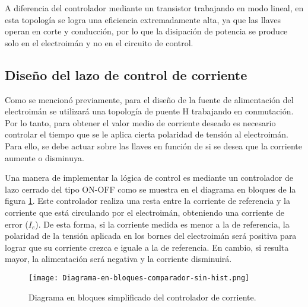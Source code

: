 A diferencia del controlador mediante un transistor trabajando en modo lineal, en esta topología se logra una eficiencia extremadamente alta, ya que las llaves operan en corte y conducción, por lo que la disipación de potencia se produce solo en el electroimán y no en el circuito de control.

\subsection{Diseño del lazo de control de corriente}

Como se mencionó previamente, para el diseño de la fuente de alimentación del electroimán se utilizará una topología de puente H trabajando en conmutación. Por lo tanto, para obtener el valor medio de corriente deseado es necesario controlar el tiempo que se le aplica cierta polaridad de tensión al electroimán. Para ello, se debe actuar sobre las llaves en función de si se desea que la corriente aumente o disminuya.

Una manera de implementar la lógica de control es mediante un controlador de lazo cerrado del tipo ON-OFF como se muestra en el diagrama en bloques de la figura \ref{fig:img_diag-en-bloques-comparador-sin-hist}. Este controlador realiza una resta entre la corriente de referencia y la corriente que está circulando por el electroimán, obteniendo una corriente de error ($I_e$). De esta forma, si la corriente medida es menor a la de referencia, la polaridad de la tensión aplicada en los bornes del electroimán será positiva para lograr que su corriente crezca e iguale a la de referencia. En cambio, si resulta mayor, la alimentación será negativa y la corriente disminuirá.

\begin{figure}[H]
	\centering
	\texttt{[image: Diagrama-en-bloques-comparador-sin-hist.png]}
	\caption{Diagrama en bloques simplificado del controlador de corriente.}
	\label{fig:img_diag-en-bloques-comparador-sin-hist}
\end{figure}







